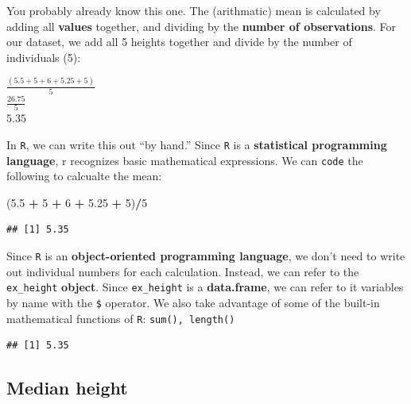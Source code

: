 \documentclass[
]{book}
\newenvironment{Shaded}{\begin{snugshade}}{\end{snugshade}}
\newcommand{\DecValTok}[1]{\textcolor[rgb]{0.00,0.00,0.81}{#1}}
\newcommand{\FloatTok}[1]{\textcolor[rgb]{0.00,0.00,0.81}{#1}}
\newcommand{\FunctionTok}[1]{\textcolor[rgb]{0.13,0.29,0.53}{\textbf{#1}}}
\newcommand{\NormalTok}[1]{#1}
\newcommand{\SpecialCharTok}[1]{\textcolor[rgb]{0.81,0.36,0.00}{\textbf{#1}}}
\begin{document}
You probably already know this one. The (arithmatic) mean is calculated by adding all \textbf{values} together, and dividing by the \textbf{number of observations}. For our dataset, we add all 5 heights together and divide by the number of individuals (5):

\(\frac{(5.5 + 5 + 6 + 5.25 + 5)}{5}\)\\
\(\frac{26.75}{5}\)\\
\(5.35\)

In \texttt{R}, we can write this out ``by hand.'' Since \texttt{R} is a \textbf{statistical programming language}, r recognizes basic mathematical expressions. We can \texttt{code} the following to calcualte the mean:

\begin{Shaded}
\begin{Highlighting}[]
\NormalTok{(}\FloatTok{5.5} \SpecialCharTok{+} \DecValTok{5} \SpecialCharTok{+} \DecValTok{6} \SpecialCharTok{+} \FloatTok{5.25} \SpecialCharTok{+} \DecValTok{5}\NormalTok{)}\SpecialCharTok{/}\DecValTok{5}
\end{Highlighting}
\end{Shaded}

\begin{verbatim}
## [1] 5.35
\end{verbatim}

Since \texttt{R} is an \textbf{object-oriented programming language}, we don't need to write out individual numbers for each calculation. Instead, we can refer to the \texttt{ex\_height} \textbf{object}. Since \texttt{ex\_height} is a \textbf{data.frame}, we can refer to it variables by name with the \texttt{\$} operator. We also take advantage of some of the built-in mathematical functions of \texttt{R}: \texttt{sum(),\ length()}

\begin{Shaded}
\end{Shaded}

\begin{verbatim}
## [1] 5.35
\end{verbatim}

\hypertarget{median-height}{%
\subsection{Median height}\label{median-height}}
\end{document}
